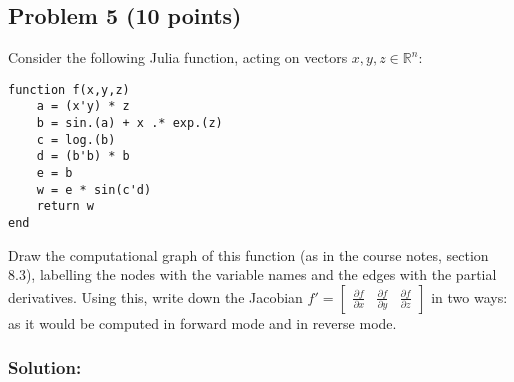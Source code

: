 \documentclass[10pt,oneside]{article}
\begin{document}
\subsection*{Problem 5 (10 points)}

Consider the following Julia function, acting on vectors $x,y,z \in \mathbb{R}^n$:

\begin{verbatim}
function f(x,y,z)
    a = (x'y) * z
    b = sin.(a) + x .* exp.(z)
    c = log.(b)
    d = (b'b) * b
    e = b
    w = e * sin(c'd)
    return w
end
\end{verbatim}

Draw the computational graph of this function (as in the course notes, section 8.3), labelling the nodes with the variable names and the edges with the partial derivatives.   Using this, write down the Jacobian $f' = \begin{bmatrix} \frac{\partial f}{\partial x} & \frac{\partial f}{\partial y} & \frac{\partial f}{\partial z} \end{bmatrix}$ in two ways: as it would be computed in forward mode and in reverse mode.

\subsubsection*{Solution:}
\end{document}
